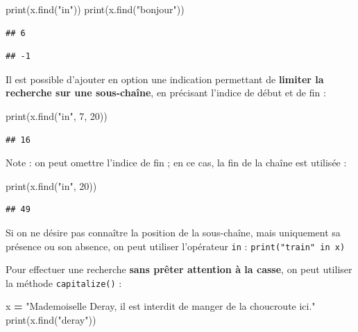 \documentclass[12pt,]{book}
\newenvironment{Shaded}{\begin{snugshade}}{\end{snugshade}}
\newcommand{\DecValTok}[1]{\textcolor[rgb]{0.00,0.00,0.81}{#1}}
\newcommand{\StringTok}[1]{\textcolor[rgb]{0.31,0.60,0.02}{#1}}
\newcommand{\OperatorTok}[1]{\textcolor[rgb]{0.81,0.36,0.00}{\textbf{#1}}}
\newcommand{\BuiltInTok}[1]{#1}
\newcommand{\NormalTok}[1]{#1}
\numberwithin{equation}{section}
\numberwithin{countremarque}{section}
\let\BeginKnitrBlock\begin \let\EndKnitrBlock\end
\begin{document}
\begin{Shaded}
\begin{Highlighting}[]
\BuiltInTok{print}\NormalTok{(x.find(}\StringTok{"in"}\NormalTok{))}
\BuiltInTok{print}\NormalTok{(x.find(}\StringTok{"bonjour"}\NormalTok{))}
\end{Highlighting}
\end{Shaded}

\begin{lstlisting}
## 6
\end{lstlisting}

\begin{lstlisting}
## -1
\end{lstlisting}

Il est possible d'ajouter en option une indication permettant de
\textbf{limiter la recherche sur une sous-chaîne}, en précisant l'indice
de début et de fin :

\begin{Shaded}
\begin{Highlighting}[]
\BuiltInTok{print}\NormalTok{(x.find(}\StringTok{"in"}\NormalTok{, }\DecValTok{7}\NormalTok{, }\DecValTok{20}\NormalTok{))}
\end{Highlighting}
\end{Shaded}

\begin{lstlisting}
## 16
\end{lstlisting}

Note : on peut omettre l'indice de fin ; en ce cas, la fin de la chaîne
est utilisée :

\begin{Shaded}
\begin{Highlighting}[]
\BuiltInTok{print}\NormalTok{(x.find(}\StringTok{"in"}\NormalTok{, }\DecValTok{20}\NormalTok{))}
\end{Highlighting}
\end{Shaded}

\begin{lstlisting}
## 49
\end{lstlisting}

\BeginKnitrBlock{remarque}
Si on ne désire pas connaître la position de la sous-chaîne, mais
uniquement sa présence ou son absence, on peut utiliser l'opérateur
\texttt{in} : \texttt{print("train"\ in\ x)}
\EndKnitrBlock{remarque}

Pour effectuer une recherche \textbf{sans prêter attention à la casse},
on peut utiliser la méthode \texttt{capitalize()} :

\begin{Shaded}
\begin{Highlighting}[]
\NormalTok{x }\OperatorTok{=} \StringTok{"Mademoiselle Deray, il est interdit de manger de la choucroute ici."}
\BuiltInTok{print}\NormalTok{(x.find(}\StringTok{"deray"}\NormalTok{))}
\end{Highlighting}
\end{Shaded}
\end{document}
